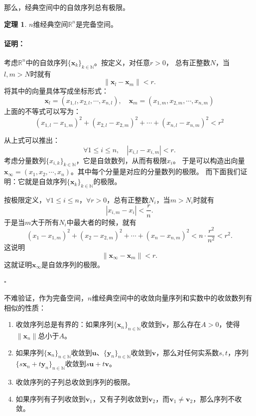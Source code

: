 \documentclass[12pt,UTF8]{ctexbook}
\theoremstyle{definition}
\newtheorem{tm}{定理}[section]
\theoremstyle{plain}
\renewenvironment{proof}{\paragraph{\textbf{证明：}}}{\hfill$\square$}
\begin{document}
\begin{appendix}
那么，经典空间中的自敛序列总有极限。
\begin{tm}\label{tm:b-0-40}
    $n$维经典空间$\mathbb{R}^n$是完备空间。
\end{tm}

\begin{proof}
    考虑$\mathbb{R}^n$中的自敛序列$\{\mathbf{x}_k\}_{k\in\mathbb{N}}$。按定义，对任意$r>0$，
    总有正整数$N$，当$l, m>N$时就有
    $$ \| \mathbf{x}_l - \mathbf{x}_m\| < r. $$
    将其中的向量具体写成坐标形式：
    $$ \mathbf{x}_l = (x_{1,l},x_{2,l}, \cdots, x_{n,l}), \quad \mathbf{x}_m = (x_{1,m},x_{2,m}, \cdots, x_{n,m})$$
    上面的不等式可以写为：
    $$ (x_{1,l} - x_{1,m})^2 + (x_{2,l} - x_{2,m})^2 + \cdots + (x_{n,l} - x_{n,m})^2 < r^2$$

    从上式可以推出：
    $$ \forall 1\leqslant i \leqslant n, \quad |x_{i,l} - x_{i,m} | < r. $$
    考虑分量数列$\{x_{i,k}\}_{k\in\mathbb{N}}$，它是自敛数列，从而有极限$x_i$。
    于是可以构造出向量$\mathbf{x}_{\infty} = (x_1,x_2,\cdots, x_n)$。其中每个分量是对应的分量数列的极限。
    而下面我们证明：它就是自敛序列$\{\mathbf{x}_k\}_{k\in\mathbb{N}}$的极限。

    按极限定义，$\forall 1\leqslant i \leqslant n$，$\forall r>0$，总有正整数$N_i$，当$m>N_i$时就有
    $$ | x_{i,m} - x_i| < \frac{r}{n}. $$
    于是当$m$大于所有$N_i$中最大者的时候，就有
    $$ (x_1 - x_{1,m})^2 + (x_2 - x_{2,m})^2 + \cdots + (x_n - x_{n,m})^2 < n\cdot \frac{r^2}{n^2} < r^2.$$
    这说明
    $$ \| \mathbf{x}_{\infty} - \mathbf{x}_m \| < r. $$
    这就证明$\mathbf{x}_{\infty}$是自敛序列的极限。

\end{proof}

不难验证，作为完备空间，$n$维经典空间中的收敛向量序列和实数中的收敛数列有相似的性质：
\begin{enumerate}
    \item 收敛序列总是有界的：如果序列$\{\mathbf{x}_n\}_{n\in\mathbb{N}}$收敛到$\mathbf{v}$，那么存在$A>0$，使得$\|\mathbf{x}_n\|$总小于$A$。
    \item 如果序列$\{\mathbf{x}_n\}_{n\in\mathbb{N}}$收敛到$\mathbf{u}$、$\{\mathbf{y}_n\}_{n\in\mathbb{N}}$收敛到$\mathbf{v}$，那么对任何实系数$s,t$，序列$\{s\mathbf{x}_n + t\mathbf{y}_n\}_{n\in\mathbb{N}}$收敛到$s\mathbf{u} + t\mathbf{v}$。
    \item 收敛序列的子列总收敛到序列的极限。
    \item 如果序列有子列收敛到$\mathbf{v}_1$，又有子列收敛到$\mathbf{v}_2$，而$\mathbf{v}_1\neq \mathbf{v}_2$，那么序列不收敛。
\end{enumerate}


\end{appendix}
\end{document}
